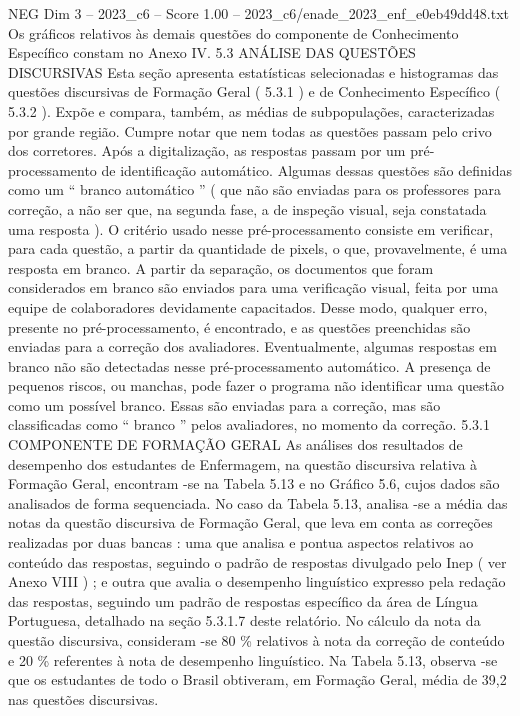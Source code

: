 \begin{textsample}{NEG Dim 3 – 2023\_c6 – Score 1.00 – 2023\_c6/enade\_2023\_enf\_e0eb49dd48.txt}
Os gráficos relativos às demais questões do componente de Conhecimento Específico constam no Anexo IV. 5.3 ANÁLISE DAS QUESTÕES DISCURSIVAS Esta seção apresenta estatísticas selecionadas e histogramas das questões discursivas de Formação Geral ( 5.3.1 ) e de Conhecimento Específico ( 5.3.2 ).
Expõe e compara, também, as médias de subpopulações, caracterizadas por grande região.
Cumpre notar que nem todas as questões passam pelo crivo dos corretores.
Após a digitalização, as respostas passam por um pré-processamento de identificação automático.
Algumas dessas questões são definidas como um “ branco automático ” ( que não são enviadas para os professores para correção, a não ser que, na segunda fase, a de inspeção visual, seja constatada uma resposta ).
O critério usado nesse pré-processamento consiste em verificar, para cada questão, a partir da quantidade de pixels, o que, provavelmente, é uma resposta em branco.
A partir da separação, os documentos que foram considerados em branco são enviados para uma verificação visual, feita por uma equipe de colaboradores devidamente capacitados.
Desse modo, qualquer erro, presente no pré-processamento, é encontrado, e as questões preenchidas são enviadas para a correção dos avaliadores.
Eventualmente, algumas respostas em branco não são detectadas nesse pré-processamento automático.
A presença de pequenos riscos, ou manchas, pode fazer o programa não identificar uma questão como um possível branco.
Essas são enviadas para a correção, mas são classificadas como “ branco ” pelos avaliadores, no momento da correção. 5.3.1 COMPONENTE DE FORMAÇÃO GERAL As análises dos resultados de desempenho dos estudantes de Enfermagem, na questão discursiva relativa à Formação Geral, encontram -se na Tabela 5.13 e no Gráfico 5.6, cujos dados são analisados de forma sequenciada.
No caso da Tabela 5.13, analisa -se a média das notas da questão discursiva de Formação Geral, que leva em conta as correções realizadas por duas bancas : uma que analisa e pontua aspectos relativos ao conteúdo das respostas, seguindo o padrão de respostas divulgado pelo Inep ( ver Anexo VIII ) ; e outra que avalia o desempenho linguístico expresso pela redação das respostas, seguindo um padrão de respostas específico da área de Língua Portuguesa, detalhado na seção 5.3.1.7 deste relatório.
No cálculo da nota da questão discursiva, consideram -se 80 \% relativos à nota da correção de conteúdo e 20 \% referentes à nota de desempenho linguístico.
Na Tabela 5.13, observa -se que os estudantes de todo o Brasil obtiveram, em Formação Geral, média de 39,2 nas questões discursivas.

\end{textsample}
